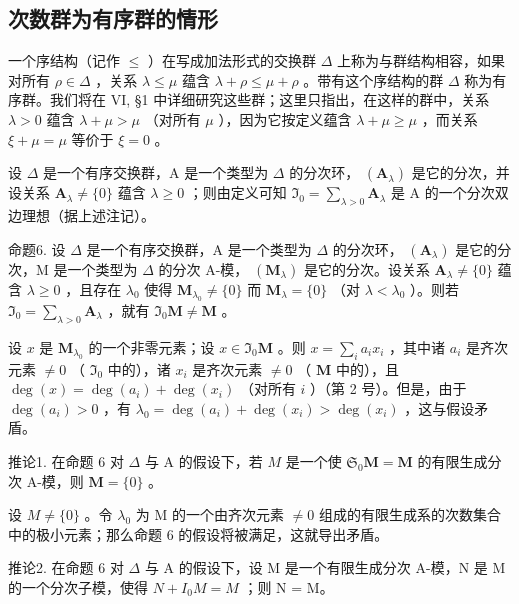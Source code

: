 \subsection{次数群为有序群的情形}

一个序结构（记作 \(\leqslant\) ）在写成加法形式的交换群 \(\Delta\) 上称为与群结构相容，如果对所有 \(\rho\in\Delta\) ，关系 \(\lambda\leqslant\mu\) 蕴含 \(\lambda+\rho\leqslant\mu+\rho\) 。带有这个序结构的群 \(\Delta\) 称为有序群。我们将在 VI, §1 中详细研究这些群；这里只指出，在这样的群中，关系 \(\lambda>0\) 蕴含 \(\lambda+\mu>\mu\) （对所有 \(\mu\) ），因为它按定义蕴含 \(\lambda+\mu\geqslant\mu\) ，而关系 \(\xi+\mu=\mu\) 等价于 \(\xi=0\) 。

设 \(\Delta\) 是一个有序交换群，A 是一个类型为 \(\Delta\) 的分次环， \((\mathbf{A}_{\lambda})\) 是它的分次，并设关系 \(\mathbf{A}_{\lambda} \neq \{0\}\) 蕴含 \(\lambda \geqslant 0\) ；则由定义可知 \(\mathfrak{I}_0 = \sum_{\lambda > 0} \mathbf{A}_{\lambda}\) 是 A 的一个分次双边理想（据上述注记）。

命题6. 设 \(\Delta\) 是一个有序交换群，A 是一个类型为 \(\Delta\) 的分次环， \((\mathbf{A}_{\lambda})\) 是它的分次，M 是一个类型为 \(\Delta\) 的分次 A-模， \((\mathbf{M}_{\lambda})\) 是它的分次。设关系 \(\mathbf{A}_{\lambda} \neq \{0\}\) 蕴含 \(\lambda \geqslant 0\) ，且存在 \(\lambda_0\) 使得 \(\mathbf{M}_{\lambda_0} \neq \{0\}\) 而 \(\mathbf{M}_{\lambda} = \{0\}\) （对 \(\lambda < \lambda_0\) ）。则若 \(\Im_0 = \sum_{\lambda > 0} \mathbf{A}_{\lambda}\) ，就有 \(\Im_0 \mathbf{M} \neq \mathbf{M}\) 。

设 \(x\) 是 \(\mathbf{M}_{\lambda_0}\) 的一个非零元素；设 \(x \in \mathfrak{I}_0\mathbf{M}\) 。则 \(x = \sum_{i} a_i x_i\) ，其中诸 \(a_i\) 是齐次元素 \(\neq 0\) （ \(\mathfrak{I}_0\) 中的），诸 \(x_i\) 是齐次元素 \(\neq 0\) （ \(\mathbf{M}\) 中的），且 \(\deg(x) = \deg(a_i) + \deg(x_i)\) （对所有 \(i\) ）（第 2 号）。但是，由于 \(\deg(a_i) > 0\) ，有 \(\lambda_0 = \deg(a_i) + \deg(x_i) > \deg(x_i)\) ，这与假设矛盾。

推论1. 在命题 6 对 \(\Delta\) 与 A 的假设下，若 \(M\) 是一个使 \(\mathfrak{S}_0\mathbf{M} = \mathbf{M}\) 的有限生成分次 A-模，则 \(\mathbf{M} = \{0\}\) 。

设 \(M \neq \{0\}\) 。令 \(\lambda_{0}\) 为 M 的一个由齐次元素 \(\neq0\) 组成的有限生成系的次数集合中的极小元素；那么命题 6 的假设将被满足，这就导出矛盾。

推论2. 在命题 6 对 \(\Delta\) 与 A 的假设下，设 M 是一个有限生成分次 A-模，N 是 M 的一个分次子模，使得 \(N + I_{0}M = M\) ；则 N = M。

